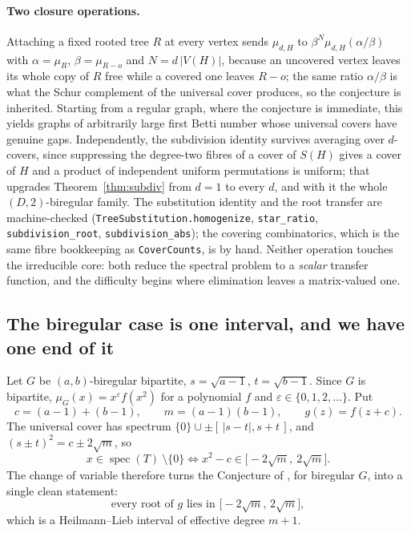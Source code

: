 \documentclass[11pt]{article}
\theoremstyle{remark}
\begin{document}
\paragraph{Two closure operations.}
Attaching a fixed rooted tree $R$ at every vertex sends $\mu_{d,H}$ to
$\beta^{N}\mu_{d,H}(\alpha/\beta)$ with $\alpha=\mu_R$, $\beta=\mu_{R-o}$ and
$N=d\,|V(H)|$, because an uncovered vertex leaves its whole copy of $R$ free while a
covered one leaves $R-o$; the same ratio $\alpha/\beta$ is what the Schur complement of
the universal cover produces, so the conjecture is inherited. Starting from a regular
graph, where the conjecture is immediate, this yields graphs of arbitrarily large first
Betti number whose universal covers have genuine gaps. Independently, the subdivision
identity survives averaging over $d$-covers, since suppressing the degree-two fibres of a
cover of $S(H)$ gives a cover of $H$ and a product of independent uniform permutations is
uniform; that upgrades Theorem~\ref{thm:subdiv} from $d=1$ to every $d$, and with it the
whole $(D,2)$-biregular family. The substitution identity and the root transfer are
machine-checked (\texttt{TreeSubstitution.homogenize}, \texttt{star\_ratio},
\texttt{subdivision\_root}, \texttt{subdivision\_abs}); the covering combinatorics, which
is the same fibre bookkeeping as \texttt{CoverCounts}, is by hand. Neither operation
touches the irreducible core: both reduce the spectral problem to a \emph{scalar} transfer
function, and the difficulty begins where elimination leaves a matrix-valued one.

\subsection{The biregular case is one interval, and we have one end of it}
Let $G$ be $(a,b)$-biregular bipartite, $s=\sqrt{a-1}$, $t=\sqrt{b-1}$. Since
$G$ is bipartite, $\mu_G(x)=x^{\varepsilon}f(x^2)$ for a polynomial $f$ and
$\varepsilon\in\{0,1,2,\dots\}$. Put
\[
c=(a-1)+(b-1),\qquad m=(a-1)(b-1),\qquad g(z)=f(z+c).
\]
The universal cover has spectrum $\{0\}\cup\pm[\,|s-t|,s+t\,]$, and
$(s\pm t)^2=c\pm2\sqrt m$, so
\[
x\in\operatorname{spec}(T)\ \setminus\{0\}
\iff
x^2-c\in\bigl[-2\sqrt m,\ 2\sqrt m\bigr].
\]
The change of variable therefore turns the Conjecture of \cite{PartI}, for biregular
$G$, into a single clean statement:
\begin{equation}\label{eq:twosided}
\text{every root of }g\text{ lies in }\bigl[-2\sqrt m,\,2\sqrt m\bigr],
\end{equation}
which is a Heilmann--Lieb interval of effective degree $m+1$.
\end{document}
